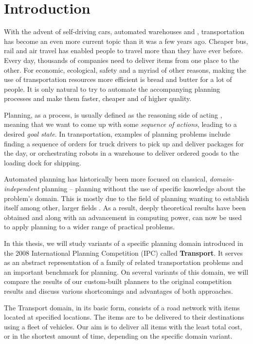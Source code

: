 \chapter*{Introduction}

With the advent of self-driving cars, automated warehouses and ,
transportation has become an even more current topic than it was a few years ago.
Cheaper bus, rail and air travel has enabled people to travel more than they have ever before.
Every day, thousands of companies need to deliver items from
one place to the other. For economic, ecological, safety and a myriad of other reasons, making the use of transportation resources more efficient is bread and butter for a lot of people. It is only natural to try to automate the accompanying planning processes and make them faster, cheaper and of higher quality.

Planning, as a process, is usually defined as the reasoning side of acting \citep[Section~1.1]{Ghallab2004}, meaning that we want to come up with some \textit{sequence of actions}, leading to a desired \textit{goal state}. In transportation, examples of planning problems include finding a sequence of orders for truck drivers to pick up and deliver packages for the day, or orchestrating robots in a warehouse to deliver ordered goods to the loading dock for shipping.

Automated planning has historically been more focused on
classical, \textit{domain-independent} planning -- planning without
the use of specific knowledge about the problem's domain.
This is mostly due to the field of planning wanting to
establish itself among other, larger fields . As a result, deeply theoretical results
have been obtained and along with an advancement in computing power, can now be used to apply planning
to a wider range of practical problems.

In this thesis, we will study variants of a specific planning domain introduced in the 2008 International Planning Competition (IPC) called \textbf{Transport}. It serves as an abstract representation of a family of related transportation problems
and an important benchmark for planning. On several variants
of this domain, we will compare the results of our custom-built planners to the original competition results and discuss
various shortcomings and advantages of both approaches.

The Transport domain, in its basic form, consists of a road network with items located at specified locations. The items are to be delivered to their destinations
using a fleet of vehicles. Our aim is to deliver all items
with the least total cost, or in the shortest amount of time, depending on the specific domain variant.

